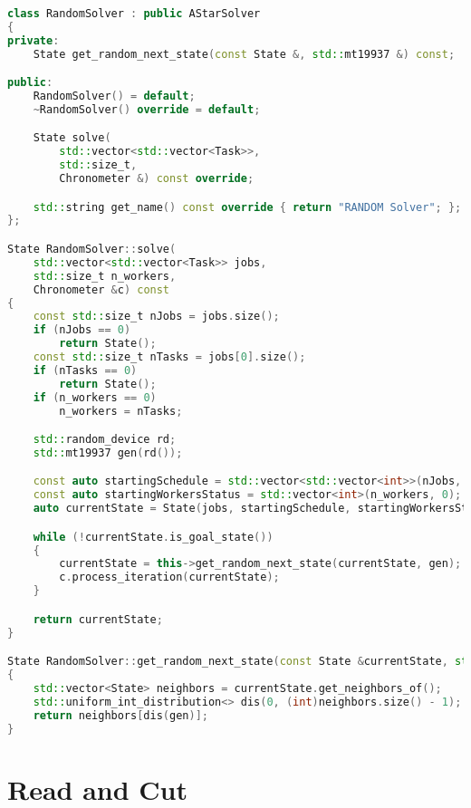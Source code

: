 \begin{lstlisting}[language=C++, caption=Clase RandomSolver utilizada para resolver un problema aleatoriamente]
class RandomSolver : public AStarSolver
{
private:
    State get_random_next_state(const State &, std::mt19937 &) const;

public:
    RandomSolver() = default;
    ~RandomSolver() override = default;

    State solve(
        std::vector<std::vector<Task>>,
        std::size_t,
        Chronometer &) const override;

    std::string get_name() const override { return "RANDOM Solver"; };
};

State RandomSolver::solve(
    std::vector<std::vector<Task>> jobs,
    std::size_t n_workers,
    Chronometer &c) const
{
    const std::size_t nJobs = jobs.size();
    if (nJobs == 0)
        return State();
    const std::size_t nTasks = jobs[0].size();
    if (nTasks == 0)
        return State();
    if (n_workers == 0)
        n_workers = nTasks;

    std::random_device rd;
    std::mt19937 gen(rd());

    const auto startingSchedule = std::vector<std::vector<int>>(nJobs, std::vector<int>(nTasks, -1));
    const auto startingWorkersStatus = std::vector<int>(n_workers, 0);
    auto currentState = State(jobs, startingSchedule, startingWorkersStatus);

    while (!currentState.is_goal_state())
    {
        currentState = this->get_random_next_state(currentState, gen);
        c.process_iteration(currentState);
    }

    return currentState;
}

State RandomSolver::get_random_next_state(const State &currentState, std::mt19937 &gen) const
{
    std::vector<State> neighbors = currentState.get_neighbors_of();
    std::uniform_int_distribution<> dis(0, (int)neighbors.size() - 1);
    return neighbors[dis(gen)];
}
\end{lstlisting}

\section{Read and Cut}
\label{sec:ReadAndCut}

